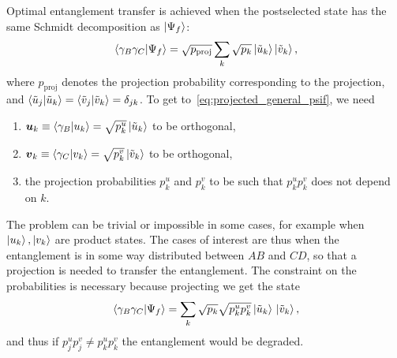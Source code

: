 \documentclass[
aps, pra, authorblock, superscriptaddress, twocolumn,
	10pt]{revtex4-1}
\newcommand{\bs}[1]{\boldsymbol{#1}}
\newcommand{\on}[1]{\operatorname{#1}}
\newcommand{\parTitle}[1]{\noindent{\color{Mahogany}(\emph{#1})}}
\begin{document}
\parTitle{Merge with above}
Optimal entanglement transfer is achieved when the postselected state has the same Schmidt decomposition as $\ket{\Psi_f}$:
\begin{equation}
    \braket*{\gamma_B\gamma_C}{\Psi_f} = \sqrt{p_{\on{proj}}}
    \sum_k \sqrt{p_k} \ket*{\tilde u_k} \!\ket*{\tilde v_k},
    \label{eq:projected_general_psif}
\end{equation}
where $p_{\on{proj}}$ denotes the projection probability corresponding to the projection, and
$\braket{\tilde u_j}{\tilde u_k}=\braket{\tilde v_j}{\tilde v_k} = \delta_{jk}$.
To get to~\cref{eq:projected_general_psif}, we need
\begin{enumerate}
    \item $\bs u_k\equiv \braket{\gamma_B}{u_k}=\sqrt{p^u_k}\ket{\tilde u_k}$ to be orthogonal,
    \item $\bs v_k\equiv \braket{\gamma_C}{v_k}=\sqrt{p^v_k}\ket{\tilde v_k}$ to be orthogonal,
    \item the projection probabilities $p^u_k$ and $p^v_k$ to be such that $p^u_k p^v_k$ does not depend on $k$.
\end{enumerate}
The problem can be trivial or impossible in some cases, for example when $\ket{u_k},\ket{v_k}$ are product states. The cases of interest are thus when the entanglement is in some way distributed between $AB$ and $CD$, so that a projection is needed to transfer the entanglement.
The constraint on the probabilities is necessary because projecting we get the state
\begin{equation}
    \braket*{\gamma_B\gamma_C}{\Psi_f} =
    \sum_k \sqrt{p_k} \sqrt{p_k^u p_k^v} \ket*{\tilde u_k}\ket*{\tilde v_k},
\end{equation}
and thus if $p_j^u p_j^v\neq p_k^u p_k^v$ the entanglement would be degraded.
\end{document}
